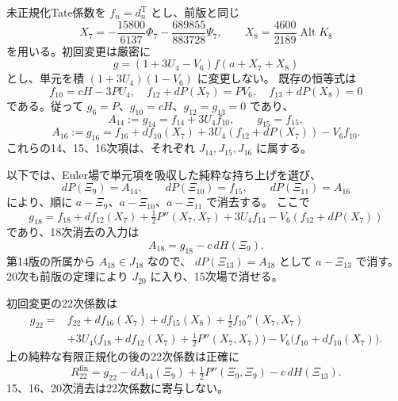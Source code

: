 未正規化Tate係数を $f_n=d_n^{\mathrm T}$ とし、前版と同じ
\[
 X_7=-\frac{15800}{6137}\Phi_7-\frac{689855}{883728}\Psi_7,
 \qquad X_8=\frac{4600}{2189}\operatorname{Alt}K_8
\]
を用いる。初回変更は厳密に
\[
 g=(1+3U_4-V_6)f(a+X_7+X_8)
\]
とし、単元を積 $(1+3U_4)(1-V_6)$ に変更しない。
既存の恒等式は
\[
 f_{10}=cH-3PU_4,\quad
 f_{12}+dP(X_7)=PV_6,\quad f_{13}+dP(X_8)=0
\]
である。従って $g_6=P$、$g_{10}=cH$、$g_{12}=g_{13}=0$ であり、
\[
 A_{14}:=g_{14}=f_{14}+3U_4f_{10},\qquad g_{15}=f_{15},
\]
\[
 A_{16}:=g_{16}=f_{16}+df_{10}(X_7)
       +3U_4(f_{12}+dP(X_7))-V_6f_{10}.
\]
これらの14、15、16次項は、それぞれ $J_{14},J_{15},J_{16}$ に属する。

以下では、Euler場で単元項を吸収した純粋な持ち上げを選び、
\[
 dP(\Xi_9)=A_{14},\qquad dP(\Xi_{10})=f_{15},\qquad
 dP(\Xi_{11})=A_{16}
\]
により、順に $a-\Xi_9$、$a-\Xi_{10}$、$a-\Xi_{11}$ で消去する。
ここで
\[
 g_{18}=f_{18}+df_{12}(X_7)+\tfrac12P''(X_7,X_7)
           +3U_4f_{14}-V_6(f_{12}+dP(X_7))
\]
であり、18次消去の入力は
\begin{equation}\label{eq:v16-eighteenth-normalizer-input}
 A_{18}=g_{18}-c\,dH(\Xi_9).
\end{equation}
第14版の所属から $A_{18}\in J_{18}$ なので、
$dP(\Xi_{13})=A_{18}$ として $a-\Xi_{13}$ で消す。
20次も前版の定理により $J_{20}$ に入り、15次場で消せる。

\begin{proposition}[二十二次の正確な有限補正式]
\label{prop:v16-exact-twenty-second-correction}
初回変更の22次係数は
\begin{equation}\label{eq:v16-initial-twenty-second}
\begin{split}
 g_{22}={}&f_{22}+df_{16}(X_7)+df_{15}(X_8)
                +\tfrac12 f_{10}''(X_7,X_7)\\
 &+3U_4\bigl(f_{18}+df_{12}(X_7)+\tfrac12P''(X_7,X_7)\bigr)
             -V_6\bigl(f_{16}+df_{10}(X_7)\bigr).
\end{split}
\end{equation}
上の純粋な有限正規化の後の22次係数は正確に
\begin{equation}\label{eq:v16-exact-twenty-second}
 R_{22}^{\mathrm{fin}}
 =g_{22}-dA_{14}(\Xi_9)+\tfrac12P''(\Xi_9,\Xi_9)
                         -c\,dH(\Xi_{13}).
\end{equation}
15、16、20次消去は22次係数に寄与しない。
\end{proposition}

